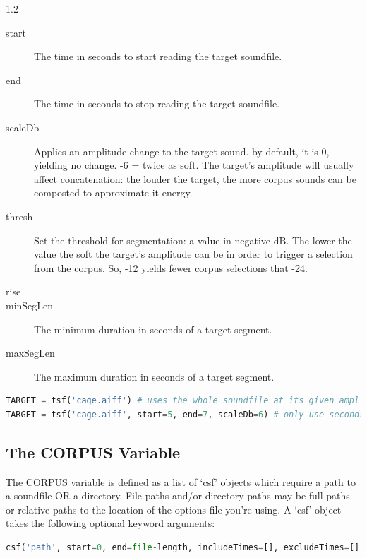 \documentclass{article}
\begin{document}
\begin{spacing}{1.2}
\begin{description}
\item[start] The time in seconds to start reading the target soundfile.
\item[end] The time in seconds to stop reading the target soundfile.  
\item[scaleDb] Applies an amplitude change to the target sound. by default, it is 0, yielding no change. -6 = twice as soft.  The target's amplitude will usually affect concatenation: the louder the target, the more corpus sounds can be composted to approximate it energy.
\item[thresh] Set the threshold for segmentation: a value in negative dB.  The lower the value the soft the target's amplitude can be in order to trigger a selection from the corpus.  So, -12 yields fewer corpus selections that -24.
\item[rise] 

\item[minSegLen] The minimum duration in seconds of a target segment.
\item[maxSegLen] The maximum duration in seconds of a target segment.

\end{description}

\begin{lstlisting}[language=python]
TARGET = tsf('cage.aiff') # uses the whole soundfile at its given amplitude
TARGET = tsf('cage.aiff', start=5, end=7, scaleDb=6) # only use seconds 5-7 of cage.aiff at double the amplitude.
\end{lstlisting}


\subsection{The CORPUS Variable}
The CORPUS variable is defined as a list of `csf' objects which require a path to a soundfile OR a directory.  File paths and/or directory paths may be full paths or relative paths to the location of the options file you're using.  A `csf' object takes the following optional keyword arguments:

\begin{lstlisting}[language=python]
csf('path', start=0, end=file-length, includeTimes=[], excludeTimes=[], limit=[], wholeFile=False, recursive=True, includeStr=None, excludeStr=None, onsetLen=0.01, offsetLen=30, transMethod=None, transQuantize=0, allowRepetition=True, restrictRepetition=0.1, restrictOverlaps=None, restrictInTime=None, scaleDb=0, superimposeRule=None, segmentationFile=None, segmentationExtension='.txt')
\end{lstlisting}



\end{spacing}
\end{document}
